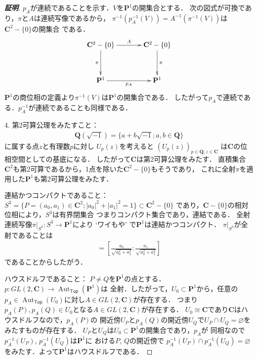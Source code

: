 \documentclass[11pt, a4paper, dvipdfmx]{jsarticle}
\theoremstyle{definition}
\newcommand{\qq}{\mathbf{Q}}
\newcommand{\cc}{\mathbf{C}}
\newcommand{\pp}{\mathbf{P}}
\newcommand{\Aut}{\mathop{\mathrm{Aut}}\nolimits}
\newcommand{\emp}{\varnothing}
\newcommand{\mapres}[2]{\left. #1 \right|_{#2}}
\newcommand{\tTop}{\textsf{Top}}
\theoremstyle{mystyle}
\numberwithin{equation}{section} %
\begin{document}
\begin{proof}[\textbf{証明}]
    $p_A$が連続であることを示す．$V$を$\pp^1$の開集合とする．
    次の図式が可換であり，$\pi$と$A$は連続写像であるから，
    $\pi^{-1}\left(p_A^{-1}(V)\right)
    =A^{-1}\left(\pi^{-1}(V)\right)$は$\cc^2-\{0\}$の開集合
    である．
    \begin{equation*}
        \vcenter{\xymatrix@C=36pt@R=36pt{
        \cc^2-\{0\} 
        \ar@{{}->}[d]_{\pi} 
        \ar@{{}->}[r]^-{A} 
        & \cc^2-\{0\} 
        \ar@{{}->}[d]^{\pi} 
        \\
        \pp^1 \ar[r]_{p_A}  
        & \pp^1 \ar@{}[lu]
        }}
    \end{equation*}
    $\pp^{1}$の商位相の定義より$\pi^{-1}(V)$は$\pp^{1}$の開集合である．
    したがって$p_A$で連続である．$p_A^{-1}$が連続であることも同様である．

    4. 
    第2可算公理をみたすこと：
    \begin{align*}
        \qq(\sqrt{-1})=\{a+b\sqrt{-1};a,b\in\qq\}
    \end{align*}
    に属する点$z$と有理数$p$に対し
    $U_{p}(z)$を考えると
    $\left(U_{p}(z)\right)_{p\in\qq,z\in\cc}$
    は$\cc$の位相空間としての基底になる．
    したがって$\cc$は第2可算公理をみたす．
    直積集合$\cc^2$も第2可算であるから，1点を除いた$\cc^2-\{0\}$もそうであり，
    これに全射$\pi$を適用した$\pp^1$も第2可算公理をみたす．

    連結かつコンパクトであること：
    $S^3=\{P=(a_0,a_1)\in\cc^2;|a_0|^2+|a_1|^2=1\}\subset\cc^2-\{0\}$
    であり，$\cc-\{0\}$の相対位相により，$S^3$は有界閉集合
    つまりコンパクト集合であり，連結である．
    全射連続写像$\mapres{\pi}{S^3}\colon S^3\to\pp^1$により 
    `ワイもや' で$\pp^1$は連結かつコンパクト．
    $\mapres{\pi}{S^3}$が全射であることは
    \begin{align*}
        [a_0\colon a_1]
        =
        \left[
            \frac{a_0}{\sqrt{a_0^2+a_1^2}}\colon \frac{a_1}{\sqrt{a_0^2+a_1^2}}
        \right]
    \end{align*}
    であることからしたがう．

    ハウスドルフであること：
    $P\neq Q$を$\pp^1$の点とする．
    $p\colon GL(2,\cc)\to \Aut_{\tTop}(\pp^1)$は
    全射．したがって，$U_0\subset \pp^1$から，任意の
    $p_{A}\in \Aut_{\tTop}(U_0)$に対し$A\in GL(2,\cc)$が存在する．
    つまり$p_A(P),p_A(Q)\in U_0$となる$A\in GL(2,\cc)$が存在する．
    $U_0\cong \cc$であり$\cc$はハウスドルフなので，$p_A(P)$の
    開近傍$U_P$と$p_A(Q)$の開近傍$U_Q$で$U_P\cap U_Q=\emp$を
    みたすものが存在する．
    $U_P$と$U_Q$は$U_0\subset\pp^1$の開集合であり，$p_{A}$が
    同相なので$p_A^{-1}(U_P)$, $p_A^{-1}(U_Q)$は$\pp^1$に
    おける$P$, $Q$の開近傍で
    $p_A^{-1}(U_P)\cap p_A^{-1}(U_Q)=\emp$
    をみたす．よって$\pp^1$はハウスドルフである．
\end{proof}
\end{document}
